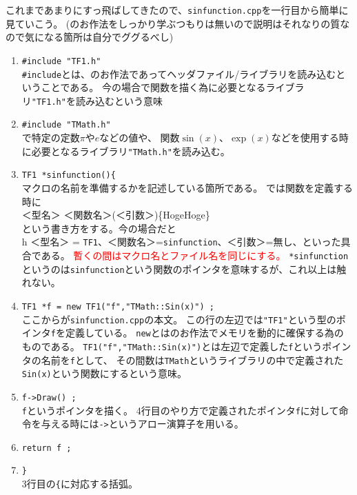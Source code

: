 これまであまりにすっ飛ばしてきたので、\verb|sinfunction.cpp|を一行目から簡単に見ていこう。
(\Cpp のお作法をしっかり学ぶつもりは無いので説明はそれなりの質なので気になる箇所は自分でググるべし)
\begin{enumerate}
 \item \verb|#include "TF1.h"| \\
       \verb|#include|とは、\Cpp のお作法であってヘッダファイル/ライブラリを読み込むということである。
       今の場合\ROOT で関数を描く為に必要となるライブラリ\verb|"TF1.h"|を読み込むという意味
 \item \verb|#include "TMath.h"| \\ 
       \ROOT で特定の定数$\pi$や$e$などの値や、
       関数$\sin(x)$、$\exp(x)$などを使用する時に必要となるライブラリ\verb|"TMath.h"|を読み込む。
 \item \verb|TF1 *sinfunction(){ |\\
       マクロの名前を準備するかを記述している箇所である。
       \Cpp では関数を定義する時に \\
       ＜型名＞ ＜関数名＞(＜引数＞)\{HogeHoge\} \\
       という書き方をする。今の場合だと\\
       h       ＜型名＞ = \verb|TF1|、＜関数名＞=\verb|sinfunction|、＜引数＞=無し、といった具合である。
       \textcolor{red}{暫くの間はマクロ名とファイル名を同じにする。}
       \verb|*sinfunction|というのは\verb|sinfunction|という関数のポインタを意味するが、これ以上は触れない。
 \item \verb|TF1 *f = new TF1("f","TMath::Sin(x)") ;| \\
       ここからが\verb|sinfunction.cpp|の本文。
       この行の左辺では\verb|"TF1"|という型のポインタ\verb|f|を定義している。
       \verb|new|とは\Cpp のお作法でメモリを動的に確保する為のものである。
       \verb|TF1("f","TMath::Sin(x)")|とは左辺で定義した\verb|f|というポインタの名前を\verb|f|として、
       その間数は\verb|TMath|というライブラリの中で定義された\verb|Sin(x)|という関数にするという意味。
 \item \verb|f->Draw() ;| \\
       \verb|f|というポインタを描く。
       4行目のやり方で定義されたポインタ\verb|f|に対して命令を与える時には\verb|->|というアロー演算子を用いる。
 \item \verb|return f ;|
 \item \verb|}| \\
       3行目の\verb|{|に対応する括弧。
\end{enumerate}



